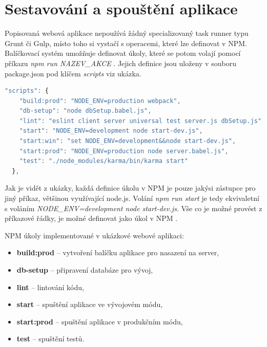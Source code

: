 \section{Sestavování a spouštění aplikace}
Popisovaná webová aplikace nepoužívá žádný specializovaný task runner typu Grunt či Gulp, místo toho si vystačí s operacemi, které lze definovat v NPM. Balíčkovací systém umožňuje definovat úkoly, které se potom volají pomocí příkazu \textit{npm run NAZEV\_AKCE} \cite{npm}. Jejich definice jsou uloženy v souboru package.json pod klíčem \textit{scripts} viz ukázka.

\begin{lstlisting}[language=Javascript,caption={Definice vlastních operací nad projektem pro NPM v souboru package.json}]
  "scripts": {
    "build:prod": "NODE_ENV=production webpack",
    "db-setup": "node dbSetup.babel.js",
    "lint": "eslint client server universal test server.js dbSetup.js",
    "start": "NODE_ENV=development node start-dev.js",
    "start:win": "set NODE_ENV=development&&node start-dev.js",
    "start:prod": "NODE_ENV=production node server.babel.js",
    "test": "./node_modules/karma/bin/karma start"
  },
\end{lstlisting}

Jak je vidět z ukázky, každá definice úkolu v NPM je pouze jakýsi zástupce pro jiný příkaz, většinou využívající node.js. Volání \textit{npm run start} je tedy ekvivaletní s voláním \textit{NODE\_ENV=development node start-dev.js}. Vše co je možné provést z příkazové řádky, je možné definovat jako úkol v NPM \cite{npm}. 

\vspace{3mm}
\noindent NPM úkoly implementované v ukázkové webové aplikaci:
\begin{itemize}
\item \textbf{build:prod} – vytvoření balíčku aplikace pro nasazení na server,
\item \textbf{db-setup} – připravení databáze pro vývoj,
\item \textbf{lint} – lintování kódu,
\item \textbf{start} – spuštění aplikace ve vývojovém módu,
\item \textbf{start:prod} – spuštění aplikace v produkčním módu,
\item \textbf{test} – spuštění testů.
\end{itemize}


